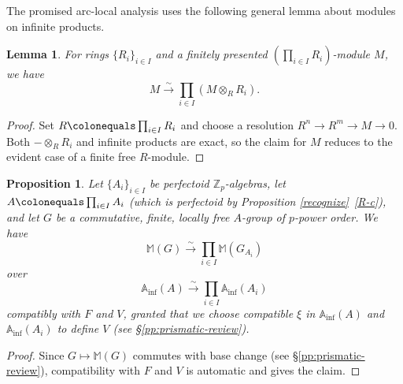 \documentclass[11pt, reqno]{amsart}
\newcommand{\bA}{\mathbb{A}}
\newcommand{\bM}{\mathbb{M}}
\newcommand{\bZ}{\mathbb{Z}}
\newcommand{\ce}{\colonequals}
\newcommand{\Inf}{\mathrm{inf}}		%
\newcommand{\isomto}{\overset{\sim}{\longrightarrow}}
\newcommand{\tensor}{\otimes} 			%
\providecommand{\up}[1]{{\upshape(}#1{\upshape)}}
\providecommand{\uref}[1]{{\upshape\ref{#1}}}
\providecommand{\uS}{{\upshape\S}}
\newcommand{\blem}{\begin{lemma}}
\newcommand{\elem}{\end{lemma}}
\newcommand{\tst}{\textstyle}
\newcommand{\bpf}{\begin{proof}}
\newcommand{\epf}{\end{proof}}
\newcommand{\bprop}{\begin{prop}}
\newcommand{\eprop}{\end{prop}}
\numberwithin{equation}{numberingbase}
\theoremstyle{thms}
\newtheorem{lemma}[numberingbase]{Lemma}
\newtheorem{prop}[numberingbase]{Proposition}
\theoremstyle{claims}
\theoremstyle{defs}
\theoremstyle{thms}
\theoremstyle{defs}
\theoremstyle{subsection-tweak}
\theoremstyle{subsection-tweak}
\begin{document}
The promised arc-local analysis uses the following 
general lemma about modules on infinite products. 


\blem \label{product-lemma}
For rings $\{R_i\}_{i \in I}$ and a finitely presented $(\prod_{i \in I} R_i)$-module $M$, we have %
\begin{equation*}
\tst M \isomto \prod_{i \in I} (M \tensor_R R_i).
\end{equation*}
\elem

\bpf
Set $R\ce \prod_{i\in I} R_i$ and choose a resolution $R^n\to R^m\to M\to 0$. Both $-\otimes_R R_i$ and 
infinite products are exact, so the claim for $M$ reduces to the evident case of a finite %
free $R$-module. %
\epf






\bprop \label{M(G)-products}
Let $\{A_i \}_{i \in I}$ be perfectoid $\bZ_p$-algebras, let $A \ce \prod_{i \in I} A_i$ \up{which is perfectoid by Proposition \uref{recognize}~\uref{R-c}}, and let $G$ be a commutative, finite, locally free $A$-group of $p$-power order. We have
\[
\tst \bM(G) \isomto \prod_{i \in I} \bM(G_{A_i})
\]
over 
\[
\tst \bA_\Inf(A) \isomto \prod_{i \in I} \bA_\Inf(A_i)
\]
compatibly with $F$ and $V$, granted that we choose compatible $\xi$ in $\bA_\Inf(A)$ and $\bA_\Inf(A_i)$ to define $V$ \up{see \uS\uref{pp:prismatic-review}}.
\eprop

\bpf
Since $G \mapsto \bM(G)$ commutes with base change (see \S\ref{pp:prismatic-review}), compatibility with $F$ and $V$ is automatic and  gives the claim.
\epf
\end{document}
